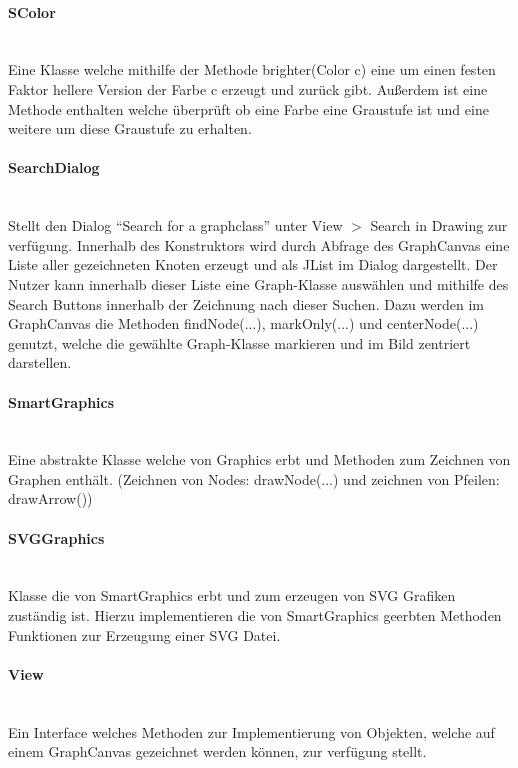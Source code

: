 \documentclass[10pt,a4paper]{article}
\begin{document}
\paragraph{SColor}\ \\Eine Klasse welche mithilfe der Methode brighter(Color c) eine um einen festen Faktor hellere Version der Farbe c erzeugt und zurück gibt. Außerdem ist eine Methode enthalten welche überprüft ob eine Farbe eine Graustufe ist und eine weitere um diese Graustufe zu erhalten.

\paragraph{SearchDialog}\ \\Stellt den Dialog "`Search for a graphclass"' unter View $>$ Search in Drawing zur verfügung. Innerhalb des Konstruktors wird durch Abfrage des GraphCanvas eine Liste aller gezeichneten Knoten erzeugt und als JList im Dialog dargestellt. Der Nutzer kann innerhalb dieser Liste eine Graph-Klasse auswählen und mithilfe des Search Buttons innerhalb der Zeichnung nach dieser Suchen. Dazu werden im GraphCanvas die Methoden findNode(...), markOnly(...) und centerNode(...) genutzt, welche die gewählte Graph-Klasse markieren und im Bild zentriert darstellen. 

\paragraph{SmartGraphics}\ \\Eine abstrakte Klasse welche von Graphics erbt und Methoden zum Zeichnen von Graphen enthält. (Zeichnen von Nodes: drawNode(...) und zeichnen von Pfeilen: drawArrow())

\paragraph{SVGGraphics}\ \\Klasse die von SmartGraphics erbt und zum erzeugen von SVG Grafiken zuständig ist. Hierzu implementieren die von SmartGraphics geerbten Methoden Funktionen zur Erzeugung einer SVG Datei.

\paragraph{View}\ \\Ein Interface welches Methoden zur Implementierung von Objekten, welche auf einem GraphCanvas gezeichnet werden können, zur verfügung stellt.
\end{document}
